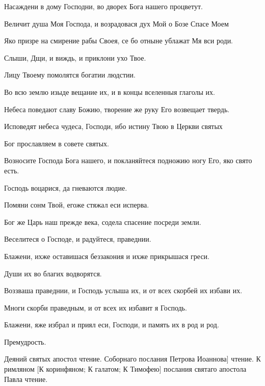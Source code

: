 \begin{mymulticols}
 Насаждени в дому Господни, во дворех Бога нашего процветут.

 Величит душа Моя Господа, и возрадовася дух Мой о Бозе Спасе Моем

 Яко призре на смирение рабы Своея, се бо отныне ублажат Мя вси роди.

 Слыши, Дщи, и виждь, и приклони ухо Твое.

 Лицу Твоему помолятся богатии людстии.

 Во всю землю изыде вещание их, и в концы вселенныя глаголы их.

 Небеса поведают славу Божию, творение же руку Его возвещает твердь.

 Исповедят небеса чудеса, Господи, ибо истину Твою в Церкви святых

 Бог прославляем в совете святых.

 Возносите Господа Бога нашего, и покланяйтеся подножию ногу Его, яко свято есть.

 Господь воцарися, да гневаются людие.

 Помяни сонм Твой, егоже стяжал еси исперва.

 Бог же Царь наш прежде века, содела спасение посреди земли. 

 Веселитеся о Господе, и радуйтеся, праведнии.

 Блажени, ихже оставишася беззакония и ихже прикрышася греси.

 Души их во благих водворятся.

 Воззваша праведнии, и Господь услыша их, и от всех скорбей их избави их.

 Многи скорби праведным, и от всех их избавит я Господь.

 Блажени, яже избрал и приял еси, Господи, и память их в род и род.

 Премудрость.

 Деяний святых апостол чтение.  Соборнаго послания Петрова \myemph{[или:} Иоаннова] чтение.  К римляном [К коринфяном; К галатом; К Тимофею] послания святаго апостола Павла чтение.


\end{mymulticols}
